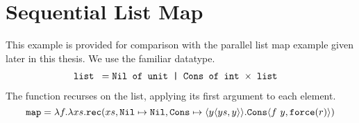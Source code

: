 \section{Sequential List Map}
\label{sec:sequential_list_map}

This example is provided for comparison with the parallel list map example
given later in this thesis. We use the familiar  datatype.
%
\begin{align*}
\texttt{list } &= \texttt{Nil of unit | Cons of int $\times$ list}
\end{align*}
%
The  function recurses on the list, applying its first argument to each
element.
%
\begin{equation*}
  \texttt{map} = \lambda f. \lambda xs . \texttt{rec}(xs, \texttt{Nil} \mapsto \texttt{Nil}, \texttt{Cons} \mapsto \langle y \langle ys, y \rangle\rangle. \texttt{Cons}\langle f\ y, \texttt{force}(r)\rangle)
\end{equation*}


